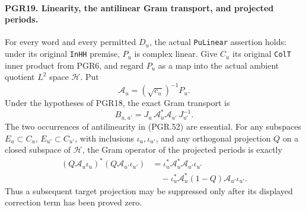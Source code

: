 \documentclass[11pt,a4paper]{article}
\numberwithin{equation}{section}
\theoremstyle{remark}\newtheorem{remark}[theorem]{Remark}
\begin{document}
\paragraph{PGR19. Linearity, the antilinear Gram transport, and projected periods.}
\label{claim:PGR19}
For every word and every permitted \(D_u\), the actual
\texttt{Pu\allowbreak Linear} assertion holds: under its original
\texttt{In\allowbreak HH} premise, \(P_u\) is complex linear.
Give \(C_u\) its original \texttt{Col\allowbreak T} inner product from
PGR6, and regard \(P_u\) as a map into the actual ambient
quotient \(L^2\) space \(\mathcal H\).  Put
\[
 \mathcal A_u=(\sqrt{c_u})^{-1}P_u.
\tag{PGR.51}
\]
Under the hypotheses of PGR18, the exact Gram transport is
\[
 B_{u,u'}=J_u\,\mathcal A_u^*\mathcal A_{u'}\,J_{u'}^{-1}.
\tag{PGR.52}
\]
The two occurrences of antilinearity in (PGR.52) are essential.
For any subspaces \(E_u\subset C_u\), \(E_{u'}\subset C_{u'}\),
with inclusions \(\iota_u,\iota_{u'}\), and any orthogonal
projection \(Q\) on a closed subspace of \(\mathcal H\),
the Gram operator of the projected periods is exactly
\[
 \begin{split}
 (Q\mathcal A_u\iota_u)^*(Q\mathcal A_{u'}\iota_{u'})
   &=\iota_u^*\mathcal A_u^*\mathcal A_{u'}\iota_{u'}\\
   &\quad-\iota_u^*\mathcal A_u^*(1-Q)
                              \mathcal A_{u'}\iota_{u'}.
 \end{split}
\tag{PGR.53}
\]
Thus a subsequent target projection may be suppressed only after
its displayed correction term has been proved zero.
\end{document}
